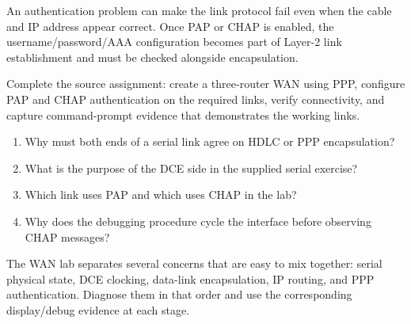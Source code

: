 \begin{pitfall}
An authentication problem can make the link protocol fail even when the cable and IP address appear correct. Once PAP or CHAP is enabled, the username/password/AAA configuration becomes part of Layer-2 link establishment and must be checked alongside encapsulation.
\end{pitfall}

\begin{tryit}
Complete the source assignment: create a three-router WAN using PPP, configure PAP and CHAP authentication on the required links, verify connectivity, and capture command-prompt evidence that demonstrates the working links.
\end{tryit}

\begin{quickcheck}
\begin{enumerate}
\item Why must both ends of a serial link agree on HDLC or PPP encapsulation?
\item What is the purpose of the DCE side in the supplied serial exercise?
\item Which link uses PAP and which uses CHAP in the lab?
\item Why does the debugging procedure cycle the interface before observing CHAP messages?
\end{enumerate}
\end{quickcheck}

\begin{chapterrecap}
The WAN lab separates several concerns that are easy to mix together: serial physical state, DCE clocking, data-link encapsulation, IP routing, and PPP authentication. Diagnose them in that order and use the corresponding display/debug evidence at each stage.
\end{chapterrecap}
